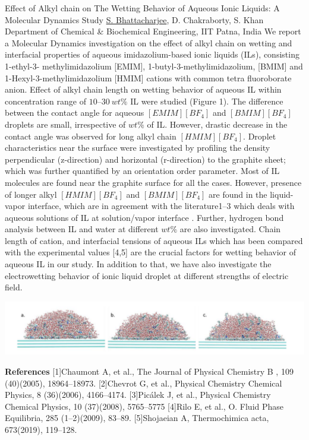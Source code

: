 
    \begin{abstract_online}{Effect of Alkyl chain on The Wetting Behavior of Aqueous Ionic Liquids: A Molecular Dynamics Study }{%
        \underline{S. Bhattacharjee}, D. Chakraborty, S. Khan}{%
        }{%
        Department of Chemical & Biochemical Engineering, IIT Patna, India}
    We report a Molecular Dynamics investigation on the effect of alkyl chain on wetting and interfacial properties of aqueous imidazolium-based ionic liquids (ILs), consisting 1-ethyl-3- methylimidazolium [EMIM], 1-butyl-3-methylimidazolium, [BMIM] and 1-Hexyl-3-methylimidazolium [HMIM] cations with common tetra fluoroborate anion. Effect of alkyl chain length on wetting behavior of aqueous IL within concentration range of $10–30 \ wt \%$ IL were studied (Figure 1). The difference between the contact angle for aqueous $[EMIM][BF_4]$ and $[BMIM][BF_4]$ droplets are small, irrespective of $wt \%$ of IL. However, drastic decrease in the contact angle was observed for long alkyl chain $[HMIM][BF_4]$. Droplet characteristics near the surface were investigated by profiling the density perpendicular (z-direction) and horizontal (r-direction) to the graphite sheet; which was further quantified by an orientation order parameter. Most of IL molecules are found near the graphite surface for all the cases. However, presence of longer alkyl $[HMIM][BF_4]$ and $[BMIM][BF_4]$ are found in the liquid-vapor interface, which are in agreement with the literature1–3 which deals with aqueous solutions of IL at solution/vapor interface . Further, hydrogen bond analysis between IL and water at different $wt \%$ are also investigated. Chain length of cation, and interfacial tensions of aqueous ILs which has been compared with the experimental values [4,5] are the crucial factors for wetting behavior of aqueous IL in our study. In addition to that, we have also investigate the electrowetting behavior of ionic liquid droplet at different strengths of electric field. \begin{center}  \includegraphics[width=\linewidth]{abstracts/txt/figures/sanchari.png}  \caption{\textbf{Figure 1:} Snapshot of $30 \ wt \%$ of aqueous a) $[EMIM][BF_4]$ b) $[BMIM][BF_4]$ c) $[HMIM][BF_4]$}  \end{center}  
    
        \textbf{References} \newline{}[1]Chaumont A, et al., The Journal of Physical Chemistry B , 109 (40)(2005), 18964–18973. \newline{}[2]Chevrot G, et al., Physical Chemistry Chemical Physics, 8 (36)(2006), 4166–4174. \newline{}[3]Picálek J, et al., Physical Chemistry Chemical Physics, 10 (37)(2008), 5765–5775 \newline{}[4]Rilo E, et al., O. Fluid Phase Equilibria, 285 (1–2)(2009), 83–89. \newline{}[5]Shojaeian A, Thermochimica acta, 673(2019), 119–128.  
    \end{abstract_online}
    